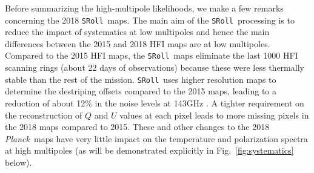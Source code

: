 \documentclass[longauth,traditabstract]{aa}
\def\Planck{\textit{Planck}}
\def\,{\thinspace}
\newcommand{\sroll}{\texttt{SRoll}}
\begin{document}
Before summarizing the high-multipole likelihoods, we make a few
remarks concerning the 2018 \sroll\ maps.  The main aim of the \sroll\
processing is to reduce the impact of systematics at low multipoles
and hence the main differences between the 2015 and 2018 HFI maps are
at low multipoles.  Compared to the 2015 HFI maps, the \sroll\ maps
eliminate the last 1000 HFI scanning rings (about 22 days of
observations) because these were less thermally stable than the rest
of the mission. \sroll\ uses higher resolution maps to determine the
destriping offsets compared to the 2015 maps, leading to a reduction of
about 12\,\% in the noise levels at 143\,GHz \citep[see figure~10
of][]{planck2016-l03}. A tighter requirement on the reconstruction
of $Q$ and $U$ values at each pixel leads to more missing pixels in the
2018 maps compared to 2015.  These and other changes to the
2018 \Planck\ maps have very little impact on the temperature and
polarization spectra at high multipoles (as will be demonstrated
explicitly in Fig.~\ref{fig:systematics} below).
\end{document}
